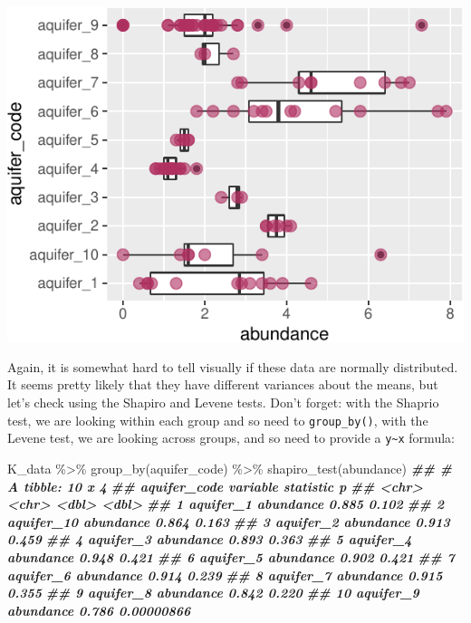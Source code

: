 \documentclass[
]{krantz}
\newenvironment{Shaded}{\begin{snugshade}}{\end{snugshade}}
\newcommand{\DocumentationTok}[1]{\textcolor[rgb]{0.56,0.35,0.01}{\textbf{\textit{#1}}}}
\newcommand{\FunctionTok}[1]{\textcolor[rgb]{0.00,0.00,0.00}{#1}}
\newcommand{\NormalTok}[1]{#1}
\newcommand{\SpecialCharTok}[1]{\textcolor[rgb]{0.00,0.00,0.00}{#1}}
\begin{document}
\begin{center}\includegraphics{index_files/figure-latex/unnamed-chunk-142-1} \end{center}

Again, it is somewhat hard to tell visually if these data are normally distributed. It seems pretty likely that they have different variances about the means, but let's check using the Shapiro and Levene tests. Don't forget: with the Shaprio test, we are looking within each group and so need to \texttt{group\_by()}, with the Levene test, we are looking across groups, and so need to provide a \texttt{y\textasciitilde{}x} formula:

\begin{Shaded}
\begin{Highlighting}[]
\NormalTok{K\_data }\SpecialCharTok{\%\textgreater{}\%}
  \FunctionTok{group\_by}\NormalTok{(aquifer\_code) }\SpecialCharTok{\%\textgreater{}\%} 
  \FunctionTok{shapiro\_test}\NormalTok{(abundance)}
\DocumentationTok{\#\# \# A tibble: 10 x 4}
\DocumentationTok{\#\#    aquifer\_code variable  statistic          p}
\DocumentationTok{\#\#    \textless{}chr\textgreater{}        \textless{}chr\textgreater{}         \textless{}dbl\textgreater{}      \textless{}dbl\textgreater{}}
\DocumentationTok{\#\#  1 aquifer\_1    abundance     0.885 0.102     }
\DocumentationTok{\#\#  2 aquifer\_10   abundance     0.864 0.163     }
\DocumentationTok{\#\#  3 aquifer\_2    abundance     0.913 0.459     }
\DocumentationTok{\#\#  4 aquifer\_3    abundance     0.893 0.363     }
\DocumentationTok{\#\#  5 aquifer\_4    abundance     0.948 0.421     }
\DocumentationTok{\#\#  6 aquifer\_5    abundance     0.902 0.421     }
\DocumentationTok{\#\#  7 aquifer\_6    abundance     0.914 0.239     }
\DocumentationTok{\#\#  8 aquifer\_7    abundance     0.915 0.355     }
\DocumentationTok{\#\#  9 aquifer\_8    abundance     0.842 0.220     }
\DocumentationTok{\#\# 10 aquifer\_9    abundance     0.786 0.00000866}
\end{Highlighting}
\end{Shaded}
\end{document}

